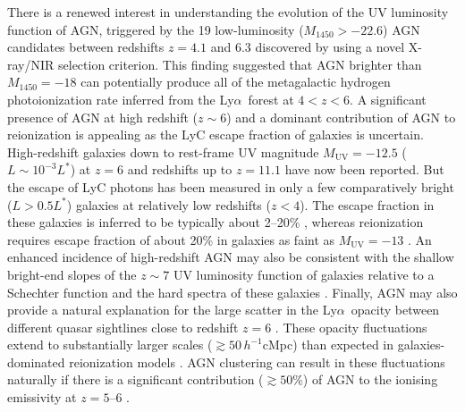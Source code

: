 \documentclass[fleqn,usenatbib]{mnras}
\def\lya{Ly$\alpha$~}
\begin{document}
There is a renewed interest in understanding the evolution of the UV
luminosity function of AGN, triggered by the 19 low-luminosity
($M_{1450}>-22.6$)
AGN candidates between redshifts $z=4.1$ and $6.3$
discovered by \citet{2015AA...578A..83G} using a novel X-ray/NIR
selection criterion.  This finding suggested that AGN brighter than
$M_{1450}=-18$ can potentially produce all of the metagalactic
hydrogen photoionization rate inferred from the \lya forest at
$4<z<6$.
A significant presence of AGN at high redshift ($z\sim 6$)
and a dominant contribution of AGN to reionization is appealing as the
LyC escape fraction of galaxies is uncertain.  High-redshift galaxies
down to rest-frame UV magnitude $M_\mathrm{UV}=-12.5$ ($L\sim
10^{-3}L^*$) at $z=6$ \citep{2017ApJ...835..113L} and redshifts up to
$z=11.1$ \citep{2016ApJ...819..129O} have now been reported.  But the
escape of LyC photons has been measured in only a few comparatively
bright ($L>0.5L^*$) galaxies at relatively low redshifts ($z < 4$).
The escape fraction in these galaxies is inferred to be typically
about 2--20\% \citep{2010ApJ...725.1011V, 2011ApJ...736...41B,
  2015ApJ...804...17S, 2015ApJ...810..107M, 2016A&A...585A..48G,
  2017MNRAS.468..389J, 2017MNRAS.465..316M}, whereas reionization
requires escape fraction of about 20\% in galaxies as faint as
$M_\mathrm{UV}=-13$ \citep{2016PASA...33...37F, 2015ApJ...802L..19R,
  2016MNRAS.457.4051K}.  An enhanced incidence of high-redshift AGN
may also be consistent with the shallow bright-end slopes of the
$z\sim 7$ UV luminosity function of galaxies relative to a Schechter
function \citep{2012MNRAS.426.2772B, 2014MNRAS.440.2810B,
  2014ApJ...792...76B, 2015MNRAS.452.1817B} and the hard spectra of
these galaxies \citep{2015MNRAS.450.1846S, 2015MNRAS.454.1393S,
  2017MNRAS.464..469S}.  Finally, AGN may also provide a natural
explanation for the large scatter in the \lya opacity between
different quasar sightlines close to redshift $z=6$
\citep{2015MNRAS.447.3402B, 2018arXiv180208177B}.
These opacity
fluctuations extend to substantially larger scales ($\gtrsim 50\,
h^{-1}$cMpc) than expected in galaxies-dominated reionization models
\citep{2015MNRAS.453.2943C}.
AGN clustering can result in these
fluctuations naturally if there is a significant contribution
($\gtrsim 50\%$) of AGN to the ionising emissivity at $z=5$--$6$
\citep{2017MNRAS.465.3429C}.
\end{document}
